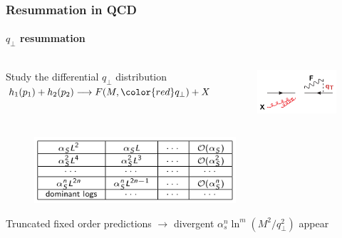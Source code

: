 \documentclass[aspectratio=43]{beamer}
\begin{document}
\begin{frame}

	\frametitle{Resummation in QCD}
	\framesubtitle{$q_{\perp}$ resummation}
	
	\begin{columns}
	
		
		\center	Study the differential $q_{\perp}$ distribution \\
		\center	$h_{1}(p_{1}) + h_{2}(p_{2}) \longrightarrow F(M, {\color{red}q_{\perp}}) + X$
	
		
		\begin{figure}
			\includegraphics[width = 4cm]{plots/qT_diagram.png}
		\end{figure}

	\end{columns}

	\begin{figure}
		\includegraphics[width = 7.5cm]{plots/qT_logs_table.png}
	\end{figure}

	Truncated fixed order predictions $\rightarrow$ {\color{red}divergent $\alpha_{s}^{n}\ln^{m}(M^{2}/q_{\perp}^{2})$ appear}

\end{frame}
\end{document}
